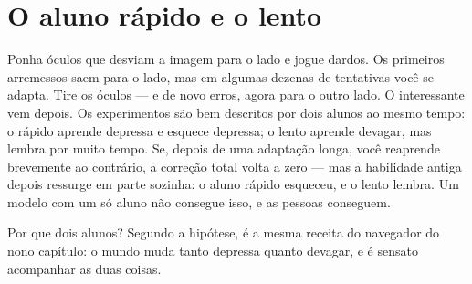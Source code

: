 \section*{O aluno rápido e o lento}

Ponha óculos que desviam a imagem para o lado e jogue dardos. Os primeiros arremessos saem para o lado, mas em algumas dezenas de tentativas você se adapta. Tire os óculos --- e de novo erros, agora para o outro lado. O interessante vem depois. Os experimentos são bem descritos por dois alunos ao mesmo tempo: o rápido aprende depressa e esquece depressa; o lento aprende devagar, mas lembra por muito tempo. Se, depois de uma adaptação longa, você reaprende brevemente ao contrário, a correção total volta a zero --- mas a habilidade antiga depois ressurge em parte sozinha: o aluno rápido esqueceu, e o lento lembra. Um modelo com um só aluno não consegue isso, e as pessoas conseguem.


Por que dois alunos? Segundo a hipótese, é a mesma receita do navegador do nono capítulo: o mundo muda tanto depressa quanto devagar, e é sensato acompanhar as duas coisas.

